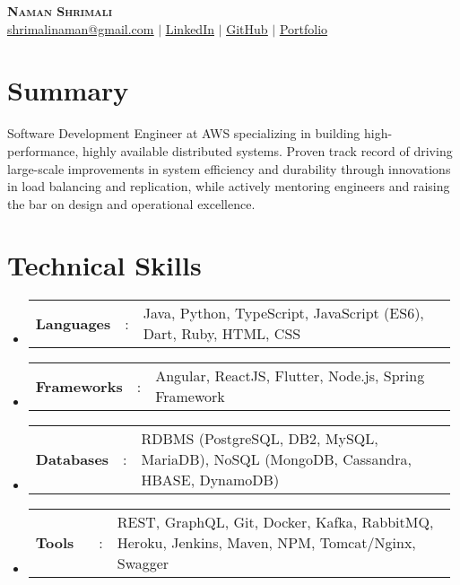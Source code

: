 \documentclass[a4paper,10pt]{article}
\newcommand{\link}[2]{\textcolor{blue!70!white}{\uline{\href{#1}{#2}}}}
\newcommand{\resumeSectionType}[3]{
  \item\begin{tabular*}{0.96\textwidth}[t]{
    p{0.15\linewidth}p{0.02\linewidth}p{0.81\linewidth}
  }
    \textbf{#1} & #2 & #3
  \end{tabular*}\vspace{-2pt}
}
\newcommand{\resumeHeadingListStart}{
  \begin{itemize}[leftmargin=0.15in, label={}]
}
\newcommand{\resumeHeadingListEnd}{\end{itemize}}
\begin{document}
\justifying


\begin{center}
  \textbf{\Huge \scshape Naman Shrimali} \\ \vspace{1pt}
  \link{mailto:shrimalinaman@gmail.com}{shrimalinaman@gmail.com}
  $|$
  \link{https://www.linkedin.com/in/namanshrimali/}{LinkedIn}
  $|$
  \link{https://github.com/namanshrimali}{GitHub}
  $|$
  \link{https://namanshrimali.com}{Portfolio}
\end{center}



\section{Summary}
\small{
  Software Development Engineer at AWS specializing in building high-performance, highly available distributed systems. Proven track record of driving large-scale improvements in system efficiency and durability through innovations in load balancing and replication, while actively mentoring engineers and raising the bar on design and operational excellence.}

\vspace{-0.8\baselineskip}


\section{Technical Skills}
  \resumeHeadingListStart{}
    \resumeSectionType{Languages}{:}{Java, Python, TypeScript, JavaScript (ES6), Dart, Ruby, HTML, CSS}
    \resumeSectionType{Frameworks}{:}{Angular, ReactJS, Flutter, Node.js, Spring Framework}
    \resumeSectionType{Databases}{:}{RDBMS (PostgreSQL, DB2, MySQL, MariaDB), NoSQL (MongoDB, Cassandra, HBASE, DynamoDB)}
    \resumeSectionType{Tools}{:}{REST, GraphQL, Git, Docker, Kafka, RabbitMQ, Heroku, Jenkins, Maven, NPM, Tomcat/Nginx, Swagger}
  \resumeHeadingListEnd{}

\vspace{-0.8\baselineskip}
\end{document}
